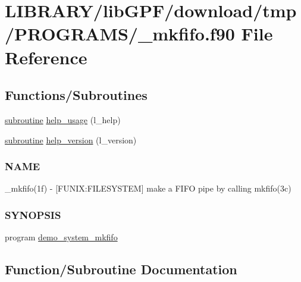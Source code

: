 \hypertarget{__mkfifo_8f90}{}\section{L\+I\+B\+R\+A\+R\+Y/lib\+G\+P\+F/download/tmp/\+P\+R\+O\+G\+R\+A\+M\+S/\+\_\+mkfifo.f90 File Reference}
\label{__mkfifo_8f90}
\subsection*{Functions/\+Subroutines}
\begin{DoxyCompactItemize}
\item 
\hyperlink{M__stopwatch_83_8txt_acfbcff50169d691ff02d4a123ed70482}{subroutine} \hyperlink{__mkfifo_8f90_a3e09a3b52ee8fb04eeb93fe5761626a8}{help\+\_\+usage} (l\+\_\+help)
\item 
\hyperlink{M__stopwatch_83_8txt_acfbcff50169d691ff02d4a123ed70482}{subroutine} \hyperlink{__mkfifo_8f90_a39c21619b08a3c22f19e2306efd7f766}{help\+\_\+version} (l\+\_\+version)
\begin{DoxyCompactList}\small\item\em \subsubsection*{N\+A\+ME}

\+\_\+mkfifo(1f) -\/ \mbox{[}F\+U\+N\+IX\+:F\+I\+L\+E\+S\+Y\+S\+T\+EM\mbox{]} make a F\+I\+FO pipe by calling mkfifo(3c) \subsubsection*{S\+Y\+N\+O\+P\+S\+IS}\end{DoxyCompactList}\item 
program \hyperlink{__mkfifo_8f90_a6c58f22de022879b9913bc1c177c62ca}{demo\+\_\+system\+\_\+mkfifo}
\end{DoxyCompactItemize}


\subsection{Function/\+Subroutine Documentation}
\mbox{\label{__mkfifo_8f90_a6c58f22de022879b9913bc1c177c62ca}} 
